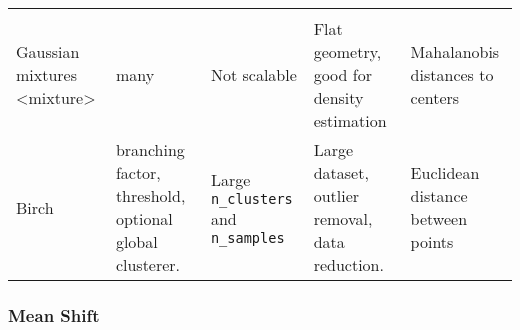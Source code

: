 \documentclass[11pt]{article}
\begin{document}
\begin{longtable}[]{@{}lllll@{}}
\begin{minipage}[t]{0.12\columnwidth}
\end{minipage}\tabularnewline
\begin{minipage}[t]{0.25\columnwidth}\raggedright
{Gaussian mixtures \textless{}mixture\textgreater{}}\strut
\end{minipage} & \begin{minipage}[t]{0.15\columnwidth}\raggedright
many\strut
\end{minipage} & \begin{minipage}[t]{0.13\columnwidth}\raggedright
Not scalable\strut
\end{minipage} & \begin{minipage}[t]{0.20\columnwidth}\raggedright
Flat geometry, good for density estimation\strut
\end{minipage} & \begin{minipage}[t]{0.12\columnwidth}\raggedright
Mahalanobis distances to centers\strut
\end{minipage}\tabularnewline
\begin{minipage}[t]{0.25\columnwidth}\raggedright
{Birch}\strut
\end{minipage} & \begin{minipage}[t]{0.15\columnwidth}\raggedright
branching factor, threshold, optional global clusterer.\strut
\end{minipage} & \begin{minipage}[t]{0.13\columnwidth}\raggedright
Large \texttt{n\_clusters} and \texttt{n\_samples}\strut
\end{minipage} & \begin{minipage}[t]{0.20\columnwidth}\raggedright
Large dataset, outlier removal, data reduction.\strut
\end{minipage} & \begin{minipage}[t]{0.12\columnwidth}\raggedright
Euclidean distance between points\strut
\end{minipage}\tabularnewline
\bottomrule
\end{longtable}

    \hypertarget{mean-shift}{%
\subsubsection{Mean Shift}\label{mean-shift}}
\end{document}
